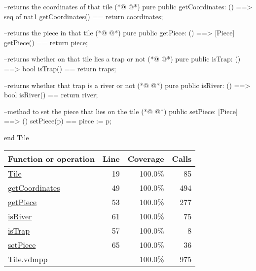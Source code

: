\begin{vdmpp}[breaklines=true]
  --returns the coordinates of that tile
(*@
\label{getCoordinates:49}
@*)
  pure public getCoordinates: () ==> seq of nat1
  getCoordinates() == return coordinates;
  
  --returns the piece in that tile
(*@
\label{getPiece:53}
@*)
  pure public getPiece: () ==> [Piece]
  getPiece() == return piece;
  
  --returns whether on that tile lies a trap or not
(*@
\label{isTrap:57}
@*)
  pure public isTrap: () ==> bool
  isTrap() == return traps;
  
  --returns whether that trap is a river or not
(*@
\label{isRiver:61}
@*)
  pure public isRiver: () ==> bool
  isRiver() == return river;
  
  --method to set the piece that lies on the tile
(*@
\label{setPiece:65}
@*)
  public setPiece: [Piece] ==> ()
  setPiece(p) == piece := p;
  
end Tile
\end{vdmpp}
\bigskip
\begin{longtable}{|l|r|r|r|}
\hline
Function or operation & Line & Coverage & Calls \\
\hline
\hline
\hyperref[Tile:19]{Tile} & 19&100.0\% & 85 \\
\hline
\hyperref[getCoordinates:49]{getCoordinates} & 49&100.0\% & 494 \\
\hline
\hyperref[getPiece:53]{getPiece} & 53&100.0\% & 277 \\
\hline
\hyperref[isRiver:61]{isRiver} & 61&100.0\% & 75 \\
\hline
\hyperref[isTrap:57]{isTrap} & 57&100.0\% & 8 \\
\hline
\hyperref[setPiece:65]{setPiece} & 65&100.0\% & 36 \\
\hline
\hline
Tile.vdmpp & & 100.0\% & 975 \\
\hline
\end{longtable}

